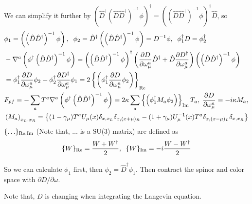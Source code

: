 We can simplify it further by $\left(\hat{D}^{\dagger}(\hat{D}\hat{D}^{\dagger})^{-1}\phi\right)^{\dagger}=\left((\hat{D}\hat{D}^{\dagger})^{-1}\phi\right)^{\dagger}\hat{D}$, so
\begin{equation}
\begin{split}
&\phi _1=\left(\left(\hat{D}\hat{D}^{\dagger}\right)^{-1}\phi\right),\;\;
 \phi _2=\hat{D}^{\dagger}\left(\left(\hat{D}\hat{D}^{\dagger}\right)^{-1}\phi\right)=D^{-1}\phi,\;\;\phi _1^{\dagger}D=\phi _2^{\dagger}\\
&-\nabla ^a \left(\phi ^{\dagger}\left(\hat{D}\hat{D}^{\dagger}\right)^{-1}\phi\right)=\left(\left(\hat{D}\hat{D}^{\dagger}\right)^{-1}\phi\right)^{\dagger}\left(\frac{\partial D}{\partial \omega _{\mu}^a}\hat{D}^{\dagger}+\hat{D}\frac{\partial D^{\dagger}}{\partial \omega _{\mu}^a}\right)\left(\left(\hat{D}\hat{D}^{\dagger}\right)^{-1}\phi\right)\\
&=\phi _1^{\dagger} \frac{\partial D}{\partial \omega _{\mu}^a} \phi _2+\phi _2^{\dagger} \frac{\partial D^{\dagger}}{\partial \omega _{\mu}^a} \phi _1=2\left\{\left(\phi _1 ^{\dagger} \frac{\partial D}{\partial \omega _{\mu}^a} \phi _2\right)\right\}_{\rm Re}\\
&F_{pf}=-\sum _a T^a \nabla ^a \left(\phi ^{\dagger}\left(\hat{D}\hat{D}^{\dagger}\right)^{-1}\phi\right)=2\kappa \sum _a \left\{\left(\phi _1 ^{\dagger} M_a \phi _2\right)\right\}_{\rm Im}T_a,\;\frac{\partial D}{\partial \omega _{\mu}^a}=-i\kappa M_a,\\
&\left(M_a\right)_{x_L,x_R}=\left\{(1-\gamma _{\mu})T^aU_{\mu}(x)\delta _{x,x_L}\delta _{x,(x+\mu)_R}-(1+\gamma _{\mu})U_{\mu}^{-1}(x)T^a\delta _{x,(x-\mu)_L}\delta _{x,x_R} \right\}\\
\end{split}
\end{equation}
$\{\ldots\}_{\rm Re,Im}$ (Note that, $\ldots$ is a SU(3) matrix) are defined as
\begin{equation}
\begin{split}
&\{W\}_{\rm Re}=\frac{W+W^{\dagger}}{2},\;\;\{W\}_{\rm Im}=-i\frac{W-W^{\dagger}}{2}\\
\end{split}
\end{equation}

So we can calculate $\phi _1$ first, then $\phi _2 = \hat{D}^{\dagger}\phi _1$. Then contract the spinor and color space with $\partial D / \partial \omega$.

Note that, $D$ is changing when integrating the Langevin equation.

